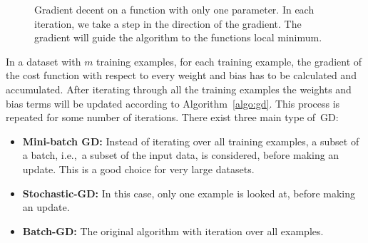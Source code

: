 \begin{figure}
\centering 
\resizebox{0.65\textwidth}{0.4\textwidth}{      

}
\caption{Gradient decent on a function with only one parameter.
%
In each iteration, we take a step in the direction of the gradient. The gradient will guide the algorithm to the functions local minimum.
}
\label{fig:gradientD}
\end{figure}
\noindent
In a dataset with $m$ training examples, for each training example, the gradient of the cost function with respect to every weight and bias has to be calculated and accumulated.
%
After iterating through all the training examples the weights and bias terms will be updated according to Algorithm~\ref{algo:gd}. This process is repeated for some number of iterations. There exist three main type of~GD: 
\begin{itemize}
\item \textbf{Mini-batch GD:} Instead of iterating over all training examples, a subset of a batch, i.e.,\ a subset of the input data, is considered, before making an update. This is a good choice for very large datasets.
\item \textbf{Stochastic-GD:} In this case, only one example is looked at, before making an update. 
\item \textbf{Batch-GD:} The original algorithm with iteration over all examples. 
\end{itemize}
